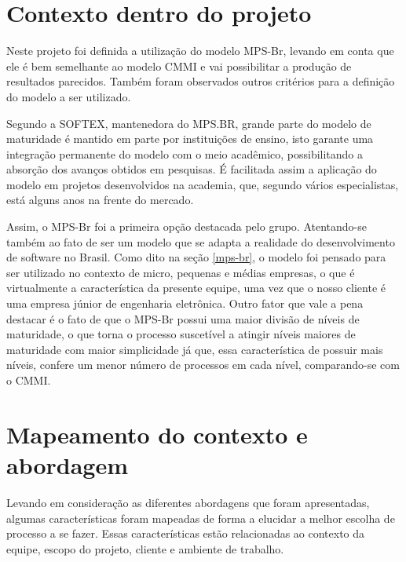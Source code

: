  \section{Contexto dentro do projeto}
Neste projeto foi definida a utilização do modelo MPS-Br, levando em conta que ele é bem semelhante ao modelo CMMI e vai possibilitar a produção de resultados parecidos. Também foram observados outros critérios para a definição do modelo a ser utilizado.

Segundo a SOFTEX, mantenedora do MPS.BR, grande parte do modelo de maturidade é mantido em parte por instituições de ensino, isto garante uma integração permanente do modelo com o meio acadêmico, possibilitando a absorção dos avanços obtidos em pesquisas. É facilitada assim a aplicação do modelo em projetos desenvolvidos na academia, que, segundo vários especialistas, está alguns anos na frente do mercado. 

Assim, o MPS-Br foi a primeira opção destacada pelo grupo. Atentando-se também ao fato de ser um modelo que se adapta a realidade do desenvolvimento de software no Brasil. Como dito na seção \ref{mps-br}, o modelo foi pensado para ser utilizado no contexto de micro, pequenas e médias empresas, o que é virtualmente a característica da presente equipe, uma vez que o nosso cliente é uma empresa júnior de engenharia eletrônica. Outro fator que vale a pena destacar é o fato de que o MPS-Br possui uma maior divisão de níveis de maturidade, o que torna o processo suscetível a atingir níveis maiores de maturidade com maior simplicidade já que, essa característica de possuir mais níveis, confere um menor número de processos em cada nível, comparando-se com o CMMI.
\section{Mapeamento do contexto e abordagem}
Levando em consideração as diferentes abordagens que foram apresentadas, algumas características foram mapeadas de forma a elucidar a melhor escolha de processo a se fazer. Essas características estão relacionadas ao contexto da equipe, escopo do projeto, cliente e ambiente de trabalho.

